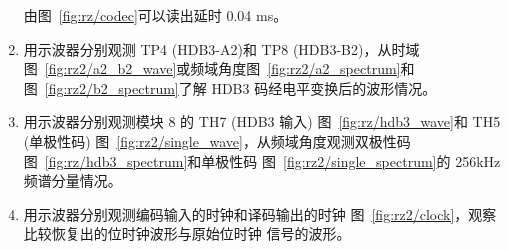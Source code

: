 \documentclass[../main]{subfiles}
\begin{document}
\begin{enumerate}
    \begin{Answer}
      由图~\ref{fig:rz/codec}可以读出延时 0.04 ms。
    \end{Answer}

  \item 用示波器分别观测 TP4 (HDB3-A2)和 TP8 (HDB3-B2)，从时域
    图~\ref{fig:rz2/a2_b2_wave}或频域角度图~\ref{fig:rz2/a2_spectrum}和
    图~\ref{fig:rz2/b2_spectrum}了解 HDB3 码经电平变换后的波形情况。
  \item 用示波器分别观测模块 8 的 TH7 (HDB3 输入)
    图~\ref{fig:rz/hdb3_wave}和 TH5 (单极性码)
    图~\ref{fig:rz2/single_wave}，从频域角度观测双极性码
    图~\ref{fig:rz/hdb3_spectrum}和单极性码
    图~\ref{fig:rz2/single_spectrum}的 256kHz 频谱分量情况。
  \item 用示波器分别观测编码输入的时钟和译码输出的时钟
    图~\ref{fig:rz2/clock}，观察比较恢复出的位时钟波形与原始位时钟
    信号的波形。
\end{enumerate}
\end{document}
